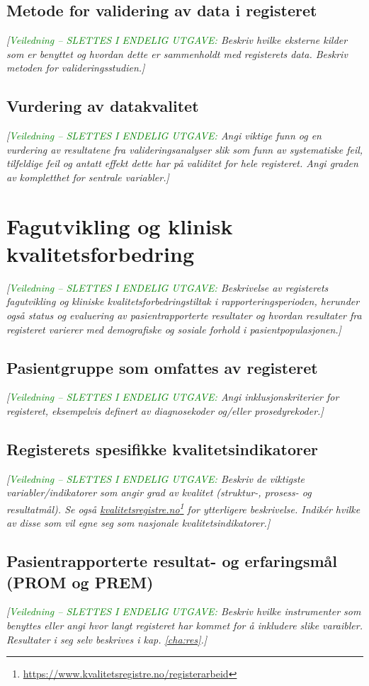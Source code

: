 \documentclass[norsk, a4paper, twocolumn]{report}
\newcommand{\newtext}[1]{\cbstart\textcolor{green}{#1\cbend}}
\newcommand{\guide}[1] {
	\textit{[\textcolor{guidegray}{\newtext{Veiledning -- SLETTES I ENDELIG
	UTGAVE:} #1}]}
	}
\begin{document}
\section{Metode for validering av data i registeret}\label{sec:metval}
\guide{Beskriv hvilke eksterne kilder som er benyttet og hvordan
dette er sammenholdt med registerets data. Beskriv metoden for
valideringsstudien.} 

\section{Vurdering av datakvalitet}\label{sec:valdat}
\guide{Angi viktige funn og en vurdering av resultatene fra
valideringsanalyser slik som funn av systematiske feil, tilfeldige feil og
antatt effekt dette har på validitet for hele registeret. Angi graden av
kompletthet for sentrale variabler.}




\chapter{Fagutvikling og klinisk kvalitetsforbedring}\label{cha:fag}
\guide{Beskrivelse av registerets fagutvikling og kliniske
kvalitetsforbedringstiltak
i rapporteringsperioden, herunder også status og evaluering av
pasientrapporterte resultater og hvordan resultater fra registeret varierer
med demografiske og sosiale forhold i pasientpopulasjonen.}

\section{Pasientgruppe som omfattes av registeret}
\guide{Angi inklusjonskriterier for registeret, eksempelvis definert av
diagnosekoder og/eller prosedyrekoder.}

\section{Registerets spesifikke kvalitetsindikatorer}\label{sec:regspe}
\guide{Beskriv de viktigste variabler/indikatorer som angir grad av
kvalitet (struktur-, prosess- og resultatmål). Se også
\href{https://www.kvalitetsregistre.no/registerarbeid}{kvalitetsregistre.no}\footnote{\url{https://www.kvalitetsregistre.no/registerarbeid}}
for ytterligere beskrivelse. Indikér hvilke av disse som vil egne seg som
nasjonale kvalitetsindikatorer.}

\section{Pasientrapporterte resultat- og erfaringsmål (PROM og PREM)}\label{sec:pasutk}
\guide{Beskriv hvilke instrumenter som benyttes eller angi hvor langt
registeret har kommet for å inkludere slike varaibler. Resultater i seg selv
beskrives i kap. \ref{cha:res}.}
\end{document}
